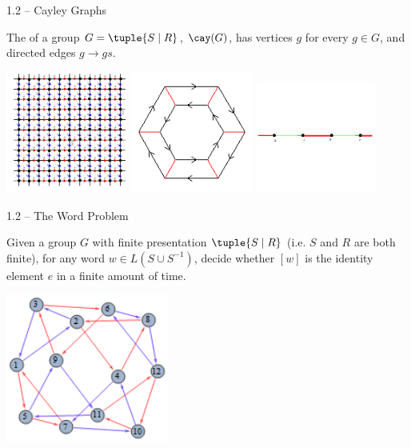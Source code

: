 \documentclass{beamer}
\theoremstyle{plain}
\begin{document}
\begin{frame}{1.2 -- Cayley Graphs}
  \begin{definition*}
    The  of a group $G = \tuple{S \mid R}$, $\cay(G)$, has
    vertices $g$ for every $g \in G$, and directed edges $g \to gs$. 
  \end{definition*}
  \begin{center}
    \pause
    \includegraphics[width=0.3\textwidth]{cayley-graph-Z2.png}
    \pause\includegraphics[width=0.3\textwidth]{cayley-graph-D_6.png}
    \pause\includegraphics[width=0.3\textwidth]{cayley-graph-Dinfinity.png}
  \end{center}
\end{frame}

\begin{frame}{1.2 -- The Word Problem}
  \begin{problem}
  Given a group $G$ with finite presentation $\tuple{S \mid R}$ (i.e. $S$ and
  $R$ are both finite), for any word $w \in L(S \cup S^{-1})$, decide
  whether $[w]$ is the identity element $e$ in a finite amount of time.   
\end{problem}
\begin{center}
  \includegraphics[width=0.4\textwidth]{cayley-graph-ex.png}
\end{center}
\end{frame}
\end{document}
